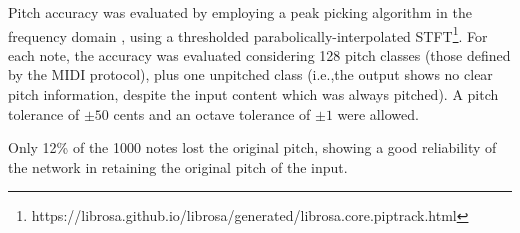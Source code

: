 Pitch accuracy was evaluated by employing a peak picking algorithm in the frequency domain \cite{JOSbook2_SASP}, using a thresholded parabolically-interpolated STFT\footnote{https://librosa.github.io/librosa/generated/librosa.core.piptrack.html}. %
For each note, the accuracy was evaluated considering 128 pitch classes (those defined by the MIDI protocol), plus one unpitched class (i.e.,the output shows no clear pitch information, despite the input content which was always pitched). A pitch tolerance of $\pm 50$ cents and an octave tolerance of $\pm 1$ were allowed.

Only 12\% of the 1000 notes lost the original pitch, showing a good reliability of the network in retaining the original pitch of the input.

